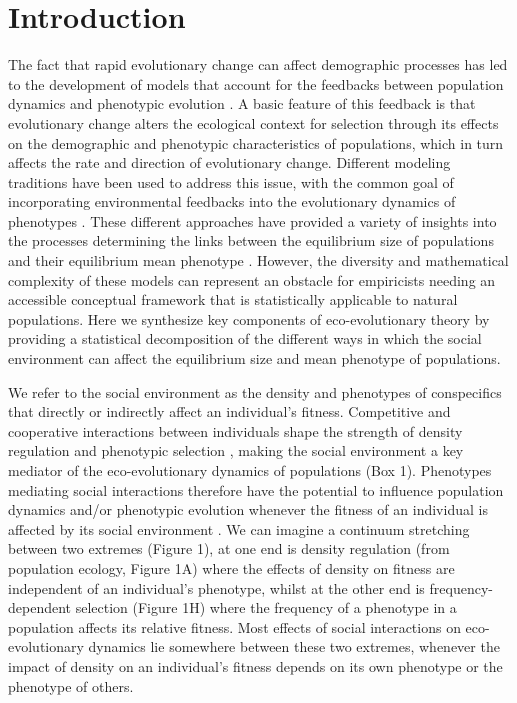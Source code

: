 \documentclass{article}
\begin{document}
	
	\newpage
	\section{Introduction}
	The fact that rapid evolutionary change can affect demographic processes has led to the development of models that account for the feedbacks between population dynamics and phenotypic evolution \cite[reviewed by][]{Pelletier2009, Hendry2018, Govaert2019}. A basic feature of this feedback is that evolutionary change alters the ecological context for selection through its effects on the demographic and phenotypic characteristics of populations, which in turn affects the rate and direction of evolutionary change. Different modeling traditions have been used to address this issue, with the common goal of incorporating environmental feedbacks into the evolutionary dynamics of phenotypes \citep{Heino1998, Lion2018}. These different approaches have provided a variety of insights into the processes determining the links between the equilibrium size of populations and their equilibrium mean phenotype \citep{MacArthur1962, Boyce1984, Charlesworth1994, Abrams1993, Mylius1995, Lande2009a, Engen2020}. However, the diversity and mathematical complexity of these models can represent an obstacle for empiricists needing an accessible conceptual framework that is statistically applicable to natural populations. Here we synthesize key components of eco-evolutionary theory by providing a statistical decomposition of the different ways in which the social environment can affect the equilibrium size and mean phenotype of populations. 
	
	We refer to the social environment as the density and phenotypes of conspecifics that directly or indirectly affect an individual's fitness. Competitive and cooperative interactions between individuals shape the strength of density regulation and phenotypic selection \citep{Lack1954, Haldane1956, West-Eberhard1979, frank1998foundations}, making the social environment a key mediator of the eco-evolutionary dynamics of populations (Box 1). Phenotypes mediating social interactions therefore have the potential to influence population dynamics and/or phenotypic evolution whenever the fitness of an individual is affected by its social environment \citep{Wolf1999SocialSelection, Travis2013}. We can imagine a continuum stretching between two extremes (Figure 1), at one end is density regulation (from population ecology, Figure 1A) where the effects of density on fitness are independent of an individual's phenotype, whilst at the other end is frequency-dependent selection (Figure 1H) where the frequency of a phenotype in a population affects its relative fitness. Most effects of social interactions on eco-evolutionary dynamics lie somewhere between these two extremes, whenever the impact of density on an individual's fitness depends on its own phenotype or the phenotype of others. 
	
\end{document}
